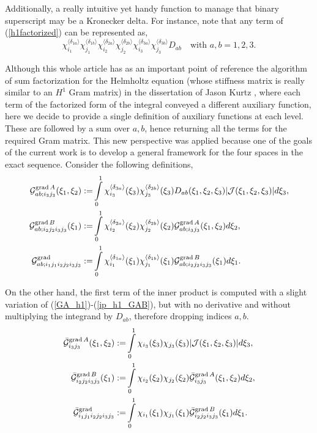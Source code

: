 Additionally, a really intuitive yet handy function to manage that binary superscript may be a Kronecker delta. For instance, note that any term of (\ref{h1factorized}) can be represented as,
% 
\begin{equation*}
    \chi_{i_1}^{\langle\delta_{1a}\rangle}\chi_{j_1}^{\langle\delta_{1b}\rangle} \chi_{i_2}^{\langle\delta_{2a}\rangle}\chi_{j_2}^{\langle\delta_{2b}\rangle}
    \chi_{i_3}^{\langle\delta_{3a}\rangle}\chi_{j_3}^{\langle\delta_{3b}\rangle} D_{ab} \quad \text{with }a,b=1,2,3.
\end{equation*}
%

Although this whole article has as an important point of reference the algorithm of sum factorization for the Helmholtz equation (whose stiffness matrix is really similar to {\color{blue}an} $H^1$ Gram matrix) in the dissertation of Jason Kurtz \cite{kurtz2007fully}, where each term of the factorized form of the integral conveyed a different auxiliary function, here we decide to provide a single definition of auxiliary functions at each level. These are followed by a sum over $a,b$, hence returning all the terms for the required Gram matrix. This new perspective was applied because one of the goals of the current work is to develop a general framework for the four spaces in the exact sequence. Consider the following definitions,
% 
\begin{align}
    \mathcal{G}_{ab;i_3j_3}^{\operatorname{grad} A}(\xi_1,\xi_2):=&\int\limits_0^1\chi_{i_3}^{\langle\delta_{3a}\rangle}(\xi_3)\chi_{j_3}^{\langle\delta_{3b}\rangle}(\xi_3) D_{ab}(\xi_1,\xi_2,\xi_3)|\mathcal{J}(\xi_1,\xi_2,\xi_3)|d\xi_3,\label{GA_h1}\\
    \mathcal{G}_{ab;i_2j_2i_3j_3}^{\operatorname{grad} B}(\xi_1):=&\int\limits_0^1\chi_{i_2}^{\langle\delta_{2a}\rangle}(\xi_2)\chi_{j_2}^{\langle\delta_{2b}\rangle}(\xi_2) \mathcal{G}_{ab;i_3j_3}^{\operatorname{grad} A}(\xi_1,\xi_2)d\xi_2,\label{GB_h1}\\
    \mathcal{G}_{ab;i_1j_1i_2j_2i_3j_3}^{\operatorname{grad}}:=&\int\limits_0^1 \chi_{i_1}^{\langle\delta_{1a}\rangle}(\xi_1)\chi_{j_1}^{\langle\delta_{1b}\rangle}(\xi_1)
    \mathcal{G}_{ab;i_2j_2i_3j_3}^{\operatorname{grad} B}(\xi_1)d\xi_1.\label{ip_h1_GAB}
\end{align}

On the other hand, the first term of the inner product is computed with a slight variation of (\ref{GA_h1})-(\ref{ip_h1_GAB}), but with no derivative and without multiplying the integrand by $D_{ab}$, therefore dropping indices $a,b$.
% 
\begin{align}
    \bar{\mathcal{G}}_{i_3j_3}^{\operatorname{grad} A}(\xi_1,\xi_2):=& \int\limits_0^1
    \chi_{i_3}(\xi_3)\chi_{j_3}(\xi_3) |\mathcal{J}(\xi_1,\xi_2,\xi_3)|d\xi_3,\label{GA0_h1}\\
    \bar{\mathcal{G}}_{i_2j_2i_3j_3}^{\operatorname{grad} B}(\xi_1):=& \int\limits_0^1
    \chi_{i_2}(\xi_2)\chi_{j_2}(\xi_2) \bar{\mathcal{G}}_{i_3j_3}^{\operatorname{grad} A} (\xi_1,\xi_2)d\xi_2,\label{GB0_h1}\\
    \bar{\mathcal{G}}_{i_1j_1i_2j_2i_3j_3}^{\operatorname{grad}}:=&\int\limits_0^1 
    \chi_{i_1}(\xi_1)\chi_{j_1}(\xi_1)\bar{\mathcal{G}}_{i_2j_2i_3j_3}^{\operatorname{grad} B}(\xi_1) d\xi_1.\label{ip_h1_GAB0}
\end{align}

